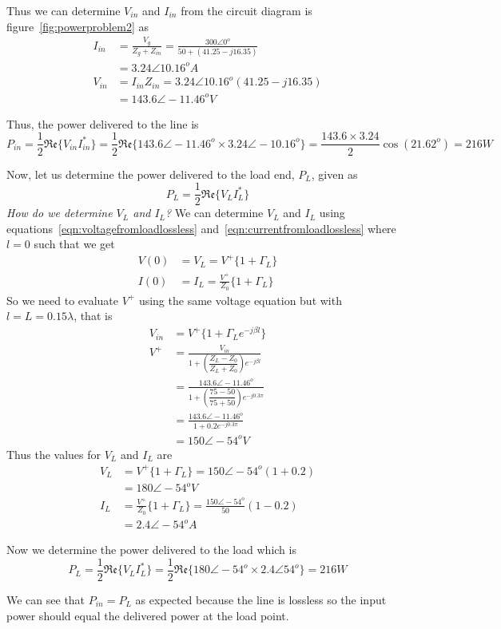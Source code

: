 \begin{exmp}
Thus we can determine $V_{in}$ and $I_{in}$ from the circuit diagram is figure~\ref{fig:powerproblem2} as
\begin{align*}
I_{in} &= \frac{V_g}{Z_g + Z_{in}} 
= \frac{300\angle0^o}{50 + (41.25 - j16.35)}\\
&= 3.24\angle10.16^oA\\
V_{in} &= I_{in}Z_{in} = 3.24\angle10.16^o(41.25 - j16.35)\\
&= 143.6\angle-11.46^oV
\end{align*}

Thus, the power delivered to the line is
\begin{dmath*}
P_{in} = \frac{1}{2}\mathfrak{Re}\lbrace V_{in}I_{in}^\ast\rbrace
= \frac{1}{2}\mathfrak{Re}\lbrace 143.6\angle-11.46^o\times3.24\angle-10.16^o\rbrace
=\frac{143.6\times3.24}{2}\cos(21.62^o)
= 216W
\end{dmath*}

Now, let us determine the power delivered to the load end, $P_L$, given as
\begin{dmath*}
P_L = \frac{1}{2}\mathfrak{Re}\lbrace V_L I_L^\ast\rbrace
\end{dmath*}
\emph{How do we determine $V_L$ and $I_L$?} We can determine $V_L$ and $I_L$ using equations~\eqref{eqn:voltagefromloadlossless} and~\eqref{eqn:currentfromloadlossless} where $l = 0$ such that we get
\begin{align*}
V(0) &= V_L = V^+\lbrace1 + \Gamma_L\rbrace\\
I(0) &= I_L = \frac{V^+}{Z_0}\lbrace1 + \Gamma_L\rbrace
\end{align*}
So we need to evaluate $V^+$ using the same voltage equation but with $l = L = 0.15\lambda$, that is
\begin{align*}
V_{in} &= V^+\lbrace1 + \Gamma_Le^{-j\beta l}\rbrace\\
V^+ &= \frac{V_{in}}{1+\left(\dfrac{Z_L - Z_0}{Z_L + Z_0}\right)e^{-j\beta l}}\\
&=\frac{143.6\angle-11.46^o}{1+\left(\dfrac{75 - 50}{75 + 50}\right)e^{-j0.3\pi}}\\
&= \frac{143.6\angle-11.46^o}{1+0.2e^{-j0.3\pi}}\\
&= 150\angle-54^oV
\end{align*}
Thus the values for $V_L$ and $I_L$ are
\begin{align*}
V_L &= V^+\lbrace1 + \Gamma_L\rbrace = 150\angle-54^o(1 + 0.2)\\
&= 180\angle-54^o V\\
I_L &= \frac{V^+}{Z_0}\lbrace1 + \Gamma_L\rbrace = \frac{150\angle-54^o}{50}(1 - 0.2)\\
&= 2.4\angle-54^oA
\end{align*}

Now we determine the power delivered to the load which is
\begin{dmath*}
P_L = \frac{1}{2}\mathfrak{Re}\lbrace V_L I_L^\ast\rbrace
= \frac{1}{2}\mathfrak{Re}\lbrace 180\angle-54^o\times 2.4\angle54^o\rbrace
= 216W
\end{dmath*}

We can see that $P_{in} = P_L$ as expected because the line is lossless so the input power should equal the delivered power at the load point.
\end{exmp}
